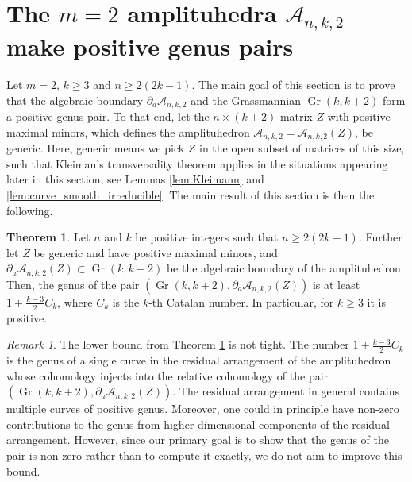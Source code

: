 \documentclass[12pt]{extarticle}
\theoremstyle{definition}
\theoremstyle{theorem}
\newtheorem{theorem}[definition]{Theorem}
\theoremstyle{remark}
\newtheorem{remark}[definition]{Remark}
\numberwithin{equation}{section}
\DeclareMathOperator{\gr}{Gr}
\newcommand{\grk}{\operatorname{Gr}(k,k+2)}
\newcommand{\aA}{\mathcal{A}}
\begin{document}
\section{The $m=2$ amplituhedra $\aA_{n,k,2}$ make positive genus pairs} \label{sec:m=2}

Let $m=2$, $k\geq 3$ and $n\geq2(2k-1)$.
The main goal of this section is to prove that the algebraic boundary $\partial_a\aA_{n,k,2}$ and the Grassmannian $\grk$ form a positive genus pair.
To that end, let the $n\times (k+2)$ matrix $Z$ with positive maximal minors, which defines the amplituhedron $\aA_{n,k,2}=\aA_{n,k,2}(Z)$, be generic.
Here, generic means we pick $Z$ in the open subset of matrices of this size, such that Kleiman's transversality theorem \cite[Theorem 1.7]{3264andallthat} applies in the situations appearing later in this section, see Lemmas \ref{lem:Kleimann} and \ref{lem:curve_smooth_irreducible}.
The main result of this section is then the following. 

\begin{theorem}\label{thm:pos_genus}
    Let $n$ and $k$ be positive integers such that $n\geq 2(2k-1)$. Further let $Z$ be generic and have positive maximal minors, 
    and $\partial_a\aA_{n,k,2}(Z)\subset\gr(k,k+2)$ be the algebraic boundary of the amplituhedron.
    Then, the genus of the pair $(\gr(k,k+2),\partial_a\aA_{n,k,2}(Z))$ is at least $1+\frac{k-3}{2}C_k$, where $C_k$ is the $k$-th Catalan number. In particular, for $k\geq 3$ it is positive. 
\end{theorem}

\begin{remark}
    The lower bound from Theorem \ref{thm:pos_genus} is not tight. The number $1+\frac{k-3}{2}C_k$ is the genus of a single curve in the residual arrangement of the amplituhedron whose cohomology injects into the relative cohomology of the pair $(\gr(k,k+2),\partial_a\aA_{n,k,2}(Z))$. The residual arrangement in general contains multiple curves of positive genus. Moreover, one could in principle have non-zero contributions to the genus from higher-dimensional components of the residual arrangement. However, since our primary goal is to show that the genus of the pair is non-zero rather than to compute it exactly, we do not aim to improve this bound.
\end{remark}
\end{document}
